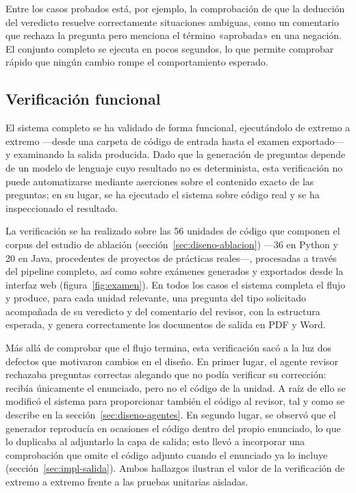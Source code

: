 Entre los casos probados está, por ejemplo, la comprobación de que la
deducción del veredicto resuelve correctamente situaciones ambiguas, como
un comentario que rechaza la pregunta pero menciona el término «aprobada»
en una negación. El conjunto completo se ejecuta en pocos segundos, lo que
permite comprobar rápido que ningún cambio rompe el comportamiento
esperado.

\subsection{Verificación funcional}
\label{sec:pruebas-funcional}

El sistema completo se ha validado de forma funcional, ejecutándolo de
extremo a extremo ---desde una carpeta de código de entrada hasta el examen
exportado--- y examinando la salida producida. Dado que la generación de
preguntas depende de un modelo de lenguaje cuyo resultado no es determinista,
esta verificación no puede automatizarse mediante aserciones sobre el contenido
exacto de las preguntas; en su lugar, se ha ejecutado el sistema sobre código
real y se ha inspeccionado el resultado.

La verificación se ha realizado sobre las 56 unidades de código que componen el
corpus del estudio de ablación (sección~\ref{sec:diseno-ablacion})
---36 en Python y 20 en Java, procedentes de proyectos de prácticas reales---,
procesadas a través del \gls{pipeline} completo, así como sobre exámenes
generados y exportados desde la interfaz web (figura~\ref{fig:examen}). En todos
los casos el sistema completa el flujo y produce, para cada unidad relevante,
una pregunta del tipo solicitado acompañada de su veredicto y del comentario del
revisor, con la estructura esperada, y genera correctamente los documentos de
salida en PDF y Word.

Más allá de comprobar que el flujo termina, esta verificación sacó a la luz dos
defectos que motivaron cambios en el diseño. En primer lugar, el agente revisor
rechazaba preguntas correctas alegando que no podía verificar su corrección:
recibía únicamente el enunciado, pero no el código de la unidad. A raíz de ello
se modificó el sistema para proporcionar también el código al revisor, tal y
como se describe en la sección~\ref{sec:diseno-agentes}. En segundo lugar, se
observó que el generador reproducía en ocasiones el código dentro del propio
enunciado, lo que lo duplicaba al adjuntarlo la capa de salida; esto llevó a
incorporar una comprobación que omite el código adjunto cuando el enunciado ya
lo incluye (sección~\ref{sec:impl-salida}). Ambos hallazgos ilustran el valor de
la verificación de extremo a extremo frente a las pruebas unitarias aisladas.

